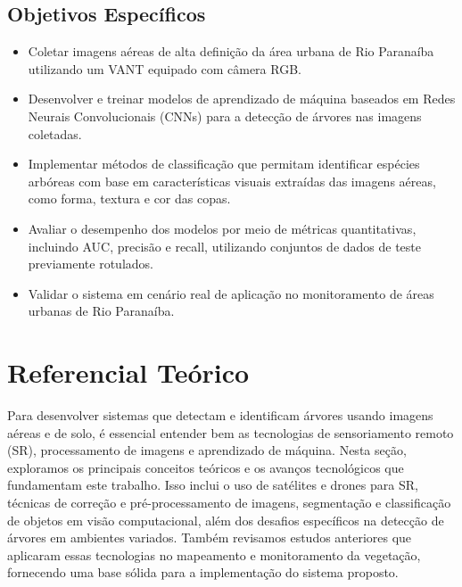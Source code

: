 \documentclass[
    12pt,                   %
    openright,              %
    oneside,                %
    a4paper,                %
    sumario=tradicional,    %
    english,                %
    brazil,                 %
    ]{abntex2}
\begin{document}
\section{Objetivos Específicos}\label{sec:ObjetivosEspec}
\begin{itemize}

\item Coletar imagens aéreas de alta definição da área urbana de Rio Paranaíba 
utilizando um VANT equipado com câmera RGB.

\item Desenvolver e treinar modelos de aprendizado de máquina baseados em Redes 
Neurais Convolucionais (CNNs) para a detecção de árvores nas imagens coletadas.

\item Implementar métodos de classificação que permitam identificar espécies arbóreas 
com base em características visuais extraídas das imagens aéreas, como forma, 
textura e cor das copas.

\item Avaliar o desempenho dos modelos por meio de métricas quantitativas, 
incluindo AUC, precisão e recall, utilizando conjuntos de dados de teste 
previamente rotulados.

\item Validar o sistema em cenário real de aplicação no monitoramento de 
áreas urbanas de Rio Paranaíba.

\end{itemize}

\chapter{Referencial Teórico}\label{sec:RefTeorico}
    Para desenvolver sistemas que detectam e identificam árvores usando imagens aéreas e de solo, é essencial entender bem as tecnologias de sensoriamento remoto (SR), processamento de imagens e aprendizado de máquina. Nesta seção, exploramos os principais conceitos teóricos e os avanços tecnológicos que fundamentam este trabalho. Isso inclui o uso de satélites e drones para SR, técnicas de correção e pré-processamento de imagens, segmentação e classificação de objetos em visão computacional, além dos desafios específicos na detecção de árvores em ambientes variados. Também revisamos estudos anteriores que aplicaram essas tecnologias no mapeamento e monitoramento da vegetação, fornecendo uma base sólida para a implementação do sistema proposto.
\end{document}
